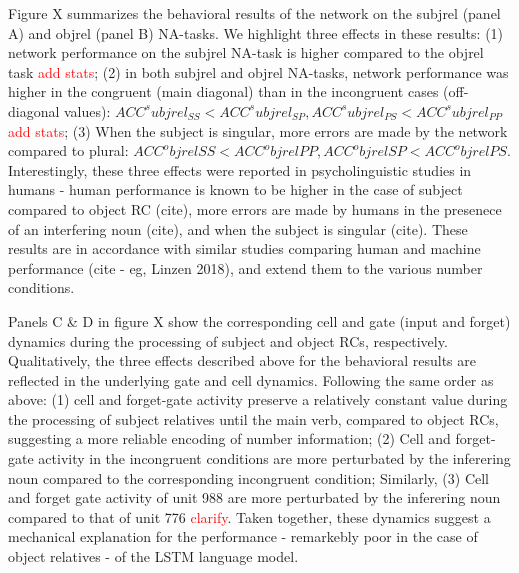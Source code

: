Figure X summarizes the behavioral results of the network on the subjrel (panel A) and objrel (panel B) NA-tasks. We highlight three effects in these results: (1) network performance on the subjrel NA-task is higher compared to the objrel task \textcolor{red}{add stats}; (2) in both subjrel and objrel NA-tasks, network performance was higher in the congruent (main diagonal) than in the incongruent cases (off-diagonal values): $ACC^subjrel_{SS}<ACC^subjrel_{SP}, ACC^subjrel_{PS}<ACC^subjrel_{PP}$ \textcolor{red}{add stats}; (3) When the subject is singular, more errors are made by the network compared to plural: $ACC^objrel{SS}<ACC^objrel{PP}, ACC^objrel{SP}<ACC^objrel{PS}$. Interestingly, these three effects were reported in psycholinguistic studies in humans - human performance is known to be higher in the case of subject compared to object RC (cite), more errors are made by humans in the presenece of an interfering noun (cite), and when the subject is singular (cite). These results are in accordance with similar studies comparing human and machine performance (cite - eg, Linzen 2018), and extend them to the various number conditions.

Panels C \& D in figure X show the corresponding cell and gate (input and forget) dynamics during the processing of subject and object RCs, respectively. Qualitatively, the three effects described above for the behavioral results are reflected in the underlying gate and cell dynamics. Following the same order as above: (1) cell and forget-gate activity preserve a relatively constant value during the processing of subject relatives until the main verb, compared to object RCs, suggesting a more reliable encoding of number information; (2) Cell and forget-gate activity in the incongruent conditions are more perturbated by the inferering noun compared to the corresponding incongruent condition; Similarly, (3) Cell and forget gate activity of unit 988 are more perturbated by the inferering noun compared to that of unit 776 \textcolor{Red}{clarify}. Taken together, these dynamics suggest a mechanical explanation for the performance - remarkebly poor in the case of object relatives - of the LSTM language model.


